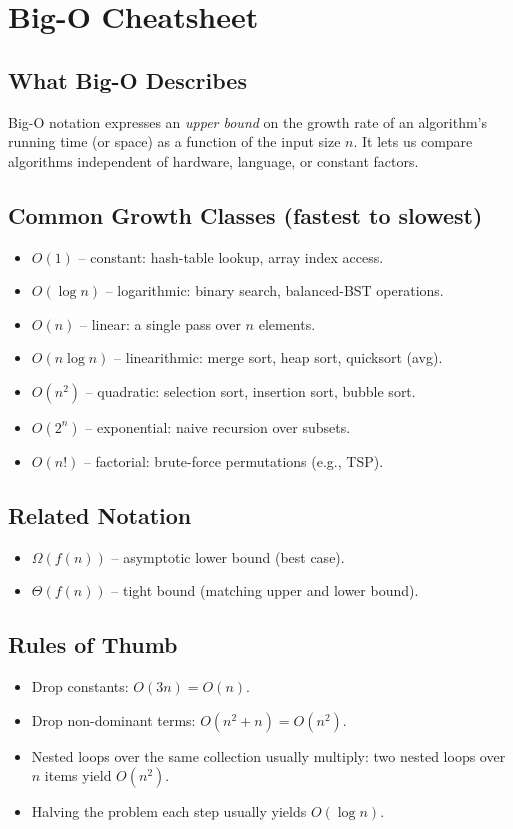 \documentclass[11pt]{article}
\begin{document}
\section{Big-O Cheatsheet}

\subsection*{What Big-O Describes}
Big-O notation expresses an \emph{upper bound} on the growth rate of an
algorithm's running time (or space) as a function of the input size $n$. It
lets us compare algorithms independent of hardware, language, or constant
factors.

\subsection*{Common Growth Classes (fastest to slowest)}
\begin{itemize}[leftmargin=*]
    \item $O(1)$ -- constant: hash-table lookup, array index access.
    \item $O(\log n)$ -- logarithmic: binary search, balanced-BST operations.
    \item $O(n)$ -- linear: a single pass over $n$ elements.
    \item $O(n \log n)$ -- linearithmic: merge sort, heap sort, quicksort (avg).
    \item $O(n^2)$ -- quadratic: selection sort, insertion sort, bubble sort.
    \item $O(2^n)$ -- exponential: naive recursion over subsets.
    \item $O(n!)$ -- factorial: brute-force permutations (e.g., TSP).
\end{itemize}

\subsection*{Related Notation}
\begin{itemize}[leftmargin=*]
    \item $\Omega(f(n))$ -- asymptotic lower bound (best case).
    \item $\Theta(f(n))$ -- tight bound (matching upper and lower bound).
\end{itemize}

\subsection*{Rules of Thumb}
\begin{itemize}[leftmargin=*]
    \item Drop constants: $O(3n) = O(n)$.
    \item Drop non-dominant terms: $O(n^2 + n) = O(n^2)$.
    \item Nested loops over the same collection usually multiply: two nested
          loops over $n$ items yield $O(n^2)$.
    \item Halving the problem each step usually yields $O(\log n)$.
\end{itemize}
\end{document}
